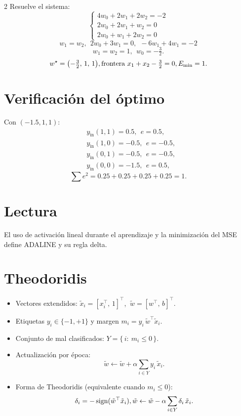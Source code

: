 \documentclass[11pt]{article}
\begin{document}
\begin{multicols}{2}
\noindent Resuelve el sistema:
\[
\begin{cases}
4w_0+2w_1+2w_2=-2\\
2w_0+2w_1+w_2=0\\
2w_0+w_1+2w_2=0
\end{cases}
\]
\[
w_1=w_2,\ \ 2w_0+3w_1=0,\ \ -6w_1+4w_1=-2
\]
\[
w_1=w_2=1,\ \ w_0=-\tfrac{3}{2}.
\]
\[
w^\star=\bigl(-\tfrac{3}{2},\,1,\,1\bigr),
\\
\text{frontera } x_1+x_2-\tfrac{3}{2}=0,
\\
E_{\min}=1.
\]

\section*{Verificación del óptimo}
Con $(-1.5,1,1)$:
\[
\begin{aligned}
&y_{\text{in}}(1,1)=0.5,\ \ e=0.5,\\
&y_{\text{in}}(1,0)=-0.5,\ \ e=-0.5,\\
&y_{\text{in}}(0,1)=-0.5,\ \ e=-0.5,\\
&y_{\text{in}}(0,0)=-1.5,\ \ e=0.5,
\end{aligned}
\]
\[
\sum e^2=0.25+0.25+0.25+0.25=1.
\]

\section*{Lectura}
El uso de activación lineal durante el aprendizaje y la minimización del MSE define ADALINE y su regla delta.




\newpage
\section*{Theodoridis}
\begin{itemize}
\item Vectores extendidos: $\tilde{x}_i=[x_i^\top,\,1]^\top$, $\ \tilde{w}=[w^\top,\,b]^\top$.
\item Etiquetas $y_i\in\{-1,+1\}$ y margen $m_i=y_i\,\tilde{w}^\top \tilde{x}_i$.
\item Conjunto de mal clasificados: $Y=\{\,i:\ m_i\le 0\,\}$.
\item Actualización por época:
\[
\tilde{w}\leftarrow \tilde{w}+\alpha\sum_{i\in Y} y_i\,\tilde{x}_i.
\]
\item Forma de Theodoridis (equivalente cuando $m_i\le 0$):
\[
\delta_i=-\operatorname{sign}(\tilde{w}^\top \tilde{x}_i),
\\
\tilde{w}\leftarrow \tilde{w}-\alpha\sum_{i\in Y}\delta_i\,\tilde{x}_i.
\]
\end{itemize}


\end{multicols}
\end{document}
